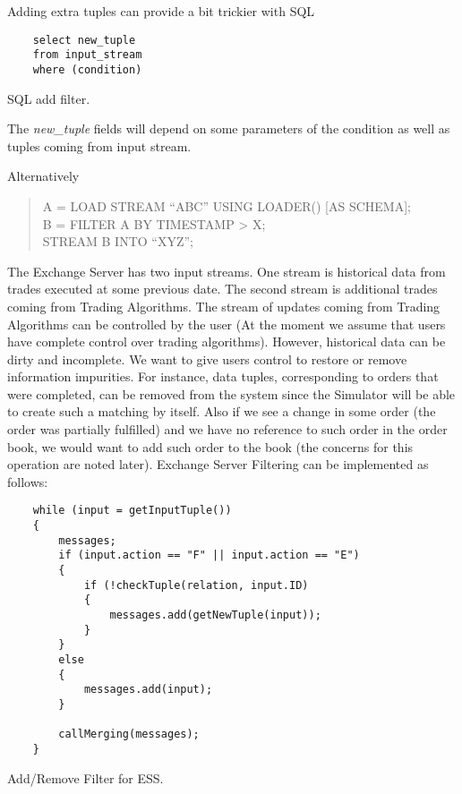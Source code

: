 \documentclass{article}
\begin{document}
Adding extra tuples can provide a bit trickier with SQL

\begin{program}
    \begin{verbatim}   
    select new_tuple
    from input_stream
    where (condition)
    \end{verbatim}
\caption{SQL add filter.}
\end{program}

\noindent The \emph{new\_tuple} fields will depend on some parameters of the condition as well as tuples coming from input stream.

Alternatively

\begin{quote}
A = LOAD STREAM {}``ABC'' USING LOADER() {[}AS SCHEMA{]};\\
B = FILTER A BY TIMESTAMP > X;\\
STREAM B INTO {}``XYZ'';
\end{quote}

The Exchange Server has two input streams. One stream is historical data from trades executed at some previous date. The second stream is additional trades coming from Trading Algorithms. The stream of updates coming from Trading Algorithms can be controlled by the user (At the moment we assume that users have complete control over trading algorithms). However, historical data can be dirty and incomplete. We want to give users control to restore or remove information impurities. For instance, data tuples, corresponding to orders that were completed, can be removed from the system since the Simulator will be able to create such a matching by itself. Also if we see a change in some order (the order was partially fulfilled) and we have no reference to such order in the order book, we would want to add such order to the book (the concerns for this operation are noted later).
Exchange Server Filtering can be implemented as follows:

\begin{program}
    \begin{verbatim}   
    while (input = getInputTuple())
    {
        messages;
        if (input.action == "F" || input.action == "E")
        {
            if (!checkTuple(relation, input.ID)
            {
                messages.add(getNewTuple(input));
            }
        }
        else
        {
            messages.add(input);
        }
        
        callMerging(messages);
    }
    \end{verbatim}
\caption{Add/Remove Filter for ESS.}
\end{program}
\end{document}
